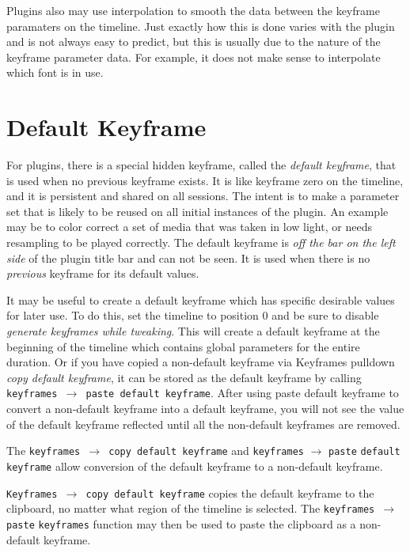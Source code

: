 Plugins also may use interpolation to smooth the data between the keyframe paramaters on the timeline.  Just exactly how this is done varies with the plugin and is not always easy to predict, but this
is usually due to the nature of the keyframe parameter data.  For example, it does not make sense to interpolate which font is in use.

\section{Default Keyframe}%
\label{sec:default_keyframe}

For plugins, there is a special hidden keyframe, called the \textit{default keyframe}, that is used when no previous keyframe exists.  It is like keyframe zero on the timeline, and it is persistent and shared on
all sessions.  The intent is to make a parameter set that is likely to be reused on all initial instances of the plugin.  An example may be to color correct a set of media that was taken in low light, or needs resampling to be played correctly.  The default keyframe is \textit{off the bar on the left side} of the plugin title bar and can not be seen.  It is used when there is no \textit{previous} keyframe for its default values.

It may be useful to create a default keyframe which has specific desirable values for later use.  To do this, set the timeline to position 0 and be sure to disable \textit{generate keyframes while tweaking}.  This will create a default keyframe at the beginning of the timeline which contains global parameters for the entire duration.  Or if you have copied a non-default keyframe via Keyframes pulldown \textit{copy default keyframe}, it can be stored as the default keyframe by calling \texttt{keyframes $\rightarrow$ paste default keyframe}.  After using paste default keyframe to convert a non-default keyframe into a default keyframe, you will not see the value of the default keyframe reflected until all the non-default keyframes are removed.

The \texttt{keyframes $\rightarrow$ copy default keyframe} and \texttt{keyframes} $\rightarrow$ \texttt{paste} \texttt{default keyframe} allow conversion of the default keyframe to a non-default keyframe.

\texttt{Keyframes $\rightarrow$ copy default keyframe} copies the default keyframe to the clipboard, no matter what region of the timeline is selected.
The \texttt{keyframes $\rightarrow$ paste} \texttt{keyframes} function may then be used to paste the clipboard as a non-default keyframe.

